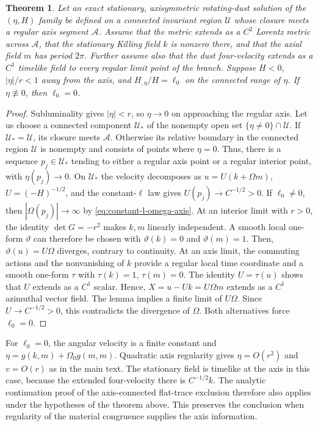 \documentclass[11pt,a4paper]{article}
\numberwithin{equation}{section}
\theoremstyle{plain}
\newtheorem{theorem}{Theorem}
\theoremstyle{definition}
\theoremstyle{remark}
\newcommand{\ellzero}{\ell_0}
\begin{document}
\begin{theorem}\label{thm:regular-axis-constant-l-no-go}
Let an exact stationary, axisymmetric rotating-dust solution of the
$(\eta,H)$ family be defined on a connected invariant region
$\mathcal U$ whose closure meets a regular axis segment $\mathcal A$.
Assume that the metric extends as a $C^2$ Lorentz metric across
$\mathcal A$, that the stationary Killing field $k$ is nonzero there,
and that the axial field $m$ has period $2\pi$. Further assume also that the dust four-velocity extends as a $C^1$ timelike field to every regular limit point of the branch. Suppose $H<0$, $|\eta|/r<1$ away from the axis, and $H_{,\eta}/H=\ellzero$ on the
connected range of $\eta$. If $\eta\not\equiv0$, then $\ellzero=0$.
\end{theorem}
\begin{proof}
Subluminality gives $|\eta|<r$, so $\eta\to 0$ on approaching the
regular axis. Let us choose a connected component $\mathcal U_*$ of the
nonempty open set $\{\eta\neq 0\}\cap\mathcal U$.
If $\mathcal U_*=\mathcal U$, its closure meets $\mathcal A$.
Otherwise its relative boundary in the connected region $\mathcal U$
is nonempty and consists of points where $\eta=0$.
Thus, there is a sequence $p_j\in\mathcal U_*$ tending to either a
regular axis point or a regular interior point, with $\eta(p_j)\longrightarrow 0$. On $\mathcal U_*$ the velocity decomposes as $u=U(k+\Omega m)$, $U=(-H)^{-1/2}$, and the constant-$\ell$ law gives $U(p_j)\longrightarrow C^{-1/2}>0$. If $\ellzero\neq 0$, then $|\Omega(p_j)|\to\infty$ by
\eqref{eq:constant-l-omega-axis}. At an interior limit with $r>0$, the identity $\det G=-r^2$ makes $k,m$ linearly independent. A smooth local one-form $\vartheta$ can
therefore be chosen with $\vartheta(k)=0$ and $\vartheta(m)=1$.
Then, $\vartheta(u)=U\Omega$ diverges, contrary to continuity.
At an axis limit, the commuting actions and the nonvanishing of $k$
provide a regular local time coordinate and a smooth one-form
$\tau$ with $\tau(k)=1$, $\tau(m)=0$. The identity $U=\tau(u)$
shows that $U$ extends as a $C^1$ scalar. Hence,
$X=u-Uk=U\Omega m$ extends as a $C^1$ azimuthal vector field.
The lemma implies a finite limit of $U\Omega$. Since $U\to C^{-1/2}>0$, this contradicts the divergence of $\Omega$. Both alternatives force $\ellzero=0$.
\end{proof}
For $\ellzero=0$, the angular velocity is a finite constant and
$\eta=g(k,m)+\Omega_0g(m,m)$. Quadratic axis regularity gives
$\eta=O(r^2)$ and $v=O(r)$ as in the main text. The stationary
field is timelike at the axis in this case, because the extended
four-velocity there is $C^{-1/2}k$. The analytic continuation proof of the axis-connected flat-trace exclusion therefore also applies under the hypotheses of the theorem
above. This preserves the conclusion when regularity of the material
congruence supplies the axis information.
\end{document}
